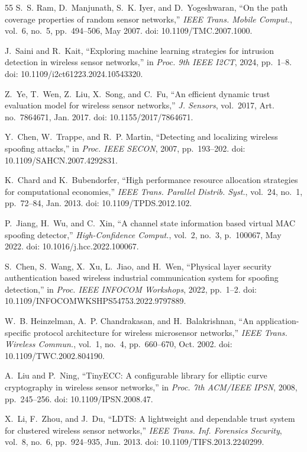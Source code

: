 \documentclass[conference]{IEEEtran}
\begin{document}
\begin{enumerate}
\begin{thebibliography}{55}
S.~S. Ram, D.~Manjunath, S.~K. Iyer, and D.~Yogeshwaran, ``On the path coverage properties of random sensor networks,'' \textit{IEEE Trans. Mobile Comput.}, vol.~6, no.~5, pp.~494--506, May 2007. doi: 10.1109/TMC.2007.1000.

J.~Saini and R.~Kait, ``Exploring machine learning strategies for intrusion detection in wireless sensor networks,'' in \textit{Proc. 9th IEEE I2CT}, 2024, pp.~1--8. doi: 10.1109/i2ct61223.2024.10543320.

Z.~Ye, T.~Wen, Z.~Liu, X.~Song, and C.~Fu, ``An efficient dynamic trust evaluation model for wireless sensor networks,'' \textit{J. Sensors}, vol.~2017, Art. no.~7864671, Jan. 2017. doi: 10.1155/2017/7864671.

Y.~Chen, W.~Trappe, and R.~P. Martin, ``Detecting and localizing wireless spoofing attacks,'' in \textit{Proc. IEEE SECON}, 2007, pp.~193--202. doi: 10.1109/SAHCN.2007.4292831.

K.~Chard and K.~Bubendorfer, ``High performance resource allocation strategies for computational economies,'' \textit{IEEE Trans. Parallel Distrib. Syst.}, vol.~24, no.~1, pp.~72--84, Jan. 2013. doi: 10.1109/TPDS.2012.102.

P.~Jiang, H.~Wu, and C.~Xin, ``A channel state information based virtual MAC spoofing detector,'' \textit{High-Confidence Comput.}, vol.~2, no.~3, p.~100067, May 2022. doi: 10.1016/j.hcc.2022.100067.

S.~Chen, S.~Wang, X.~Xu, L.~Jiao, and H.~Wen, ``Physical layer security authentication based wireless industrial communication system for spoofing detection,'' in \textit{Proc. IEEE INFOCOM Workshops}, 2022, pp.~1--2. doi: 10.1109/INFOCOMWKSHPS54753.2022.9797889.

W.~B. Heinzelman, A.~P. Chandrakasan, and H.~Balakrishnan, ``An application-specific protocol architecture for wireless microsensor networks,'' \textit{IEEE Trans. Wireless Commun.}, vol.~1, no.~4, pp.~660--670, Oct. 2002. doi: 10.1109/TWC.2002.804190.

A.~Liu and P.~Ning, ``TinyECC: A configurable library for elliptic curve cryptography in wireless sensor networks,'' in \textit{Proc. 7th ACM/IEEE IPSN}, 2008, pp.~245--256. doi: 10.1109/IPSN.2008.47.

X.~Li, F.~Zhou, and J.~Du, ``LDTS: A lightweight and dependable trust system for clustered wireless sensor networks,'' \textit{IEEE Trans. Inf. Forensics Security}, vol.~8, no.~6, pp.~924--935, Jun. 2013. doi: 10.1109/TIFS.2013.2240299.


\end{thebibliography}
\end{enumerate}
\end{document}
